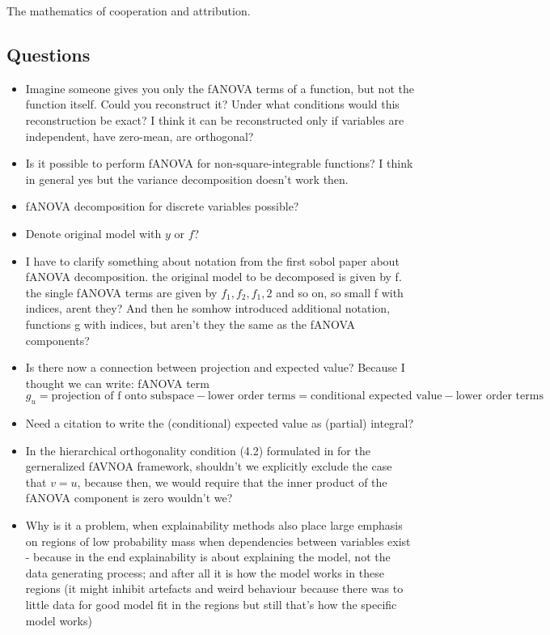 The mathematics of cooperation and attribution.


\subsection*{Questions}
\begin{itemize}
    \item Imagine someone gives you only the fANOVA terms of a function, but not the function itself. Could you reconstruct it? Under what conditions would this reconstruction be exact? I think it can be reconstructed only if variables are independent, have zero-mean, are orthogonal?
    \item Is it possible to perform fANOVA for non-square-integrable functions? I think in general yes but the variance decomposition doesn't work then.
    \item fANOVA decomposition for discrete variables possible?
    \item Denote original model with $y$ or $f$?
    \item I have to clarify something about notation from the first sobol paper about fANOVA decomposition. the original model to be decomposed is given by f. the single fANOVA terms are given by $f_1, f_2, f_1,2$ and so on, so small f with indices, arent they? And then he somhow introduced additional notation, functions g with indices, but aren't they the same as the fANOVA components? 
    \item Is there now a connection between projection and expected value? Because I thought we can write: fANOVA term $g_u = \text{projection of f onto subspace} - \text{lower order terms} = \text{conditional expected value} - \text{lower order terms}$
    \item Need a citation to write the (conditional) expected value as (partial) integral?
    \item In the hierarchical orthogonality condition (4.2) formulated in \cite{hooker2007} for the gerneralized fAVNOA framework, shouldn't we explicitly exclude the case that $v = u$, because then, we would require that the inner product of the fANOVA component is zero wouldn't we?
    \item Why is it a problem, when explainability methods also place large emphasis on regions of low probability mass when dependencies between variables exist - because in the end explainability is about explaining the model, not the data generating process; and after all it is how the model works in these regions (it might inhibit artefacts and weird behaviour because there was to little data for good model fit in the regions but still that's how the specific model works) 

\end{itemize}
